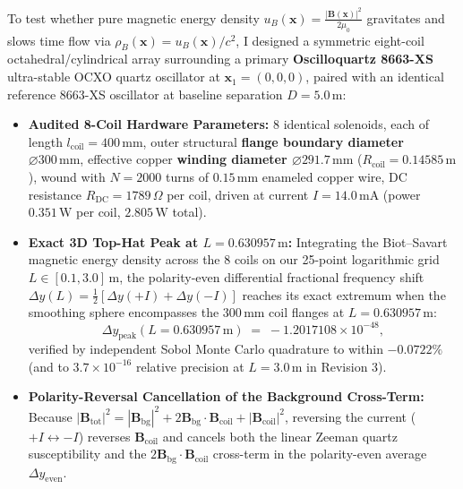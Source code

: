 \par
To test whether pure magnetic energy density $u_B(\mathbf{x}) = \frac{|\mathbf{B}(\mathbf{x})|^2}{2\mu_0}$ gravitates and slows time flow via $\rho_B(\mathbf{x}) = u_B(\mathbf{x})/c^2$, I designed a symmetric eight-coil octahedral/cylindrical array surrounding a primary \textbf{Oscilloquartz 8663-XS} ultra-stable OCXO quartz oscillator at $\mathbf{x}_1 = (0,0,0)$, paired with an identical reference 8663-XS oscillator at baseline separation $D = 5.0\,\text{m}$:
\begin{itemize}\setlength{\itemsep}{1pt}\setlength{\parskip}{0pt}\setlength{\topsep}{1pt}
  \item \textbf{Audited 8-Coil Hardware Parameters:} 8 identical solenoids, each of length $l_{\text{coil}} = 400\,\text{mm}$, outer structural \textbf{flange boundary diameter $\varnothing 300\,\text{mm}$}, effective copper \textbf{winding diameter $\varnothing 291.7\,\text{mm}$} ($R_{\text{coil}} = 0.14585\,\text{m}$), wound with $N = 2000$ turns of $0.15\,\text{mm}$ enameled copper wire, DC resistance $R_{\text{DC}} = 1789\,\Omega$ per coil, driven at current $I = 14.0\,\text{mA}$ (power $0.351\,\text{W}$ per coil, $2.805\,\text{W}$ total).
  \item \textbf{Exact 3D Top-Hat Peak at $L = 0.630957\,\text{m}$:} Integrating the Biot--Savart magnetic energy density across the 8 coils on our 25-point logarithmic grid $L \in [0.1, 3.0]\,\text{m}$, the polarity-even differential fractional frequency shift $\Delta y(L) = \frac{1}{2}[\Delta y(+I) + \Delta y(-I)]$ reaches its exact extremum when the smoothing sphere encompasses the $300\,\text{mm}$ coil flanges at \textbf{$L = 0.630957\,\text{m}$}:
  \begin{equation}
    \Delta y_{\text{peak}}(L = 0.630957\,\text{m}) \;=\; -1.2017108\times 10^{-48},
  \end{equation}
  verified by independent Sobol Monte Carlo quadrature to within $-0.0722\%$ (and to $3.7\times 10^{-16}$ relative precision at $L = 3.0\,\text{m}$ in Revision 3).
  \item \textbf{Polarity-Reversal Cancellation of the Background Cross-Term:} Because $|\mathbf{B}_{\text{tot}}|^2 = |\mathbf{B}_{\text{bg}}|^2 + 2\mathbf{B}_{\text{bg}}\cdot\mathbf{B}_{\text{coil}} + |\mathbf{B}_{\text{coil}}|^2$, reversing the current ($+I \leftrightarrow -I$) reverses $\mathbf{B}_{\text{coil}}$ and cancels both the linear Zeeman quartz susceptibility and the $2\mathbf{B}_{\text{bg}}\cdot\mathbf{B}_{\text{coil}}$ cross-term in the polarity-even average $\Delta y_{\text{even}}$.
\end{itemize}

